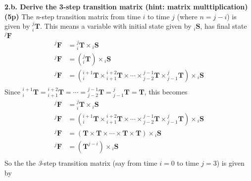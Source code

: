 \documentclass[a4paper,10pt]{article}
\newcommand{\matst}[1]{\ensuremath{{_{#1}}{\mathbf{S}}}}
\newcommand{\matfin}[1]{\ensuremath{{^{#1}}{\mathbf{F}}}}
\newcommand{\mattrans}[2]{{\ensuremath{{_{#1}^{#2}}{\mathbf{T}}}}}
\begin{document}
\newline\noindent\newline\noindent
\textbf{2.b. Derive the 3-step transition matrix (hint: matrix multtiplication) (5p)}
\newline\noindent\newline\noindent
The \emph{n}-step transition matrix from time $i$ to time $j$ (where $n=j-i$) is given by $\mattrans{i}{j}$. 
This means a variable with initial state given by $\matst{i}$, has final state $\matfin{j}$
\newline\noindent\newline\noindent
\begin{equation*}
\begin{split}
{\matfin{j}} &= \mattrans{i}{j}\times\matst{i}\\
{\matfin{j}} &= \left(\mattrans{i}{j}\right)\times\matst{i}\\
{\matfin{j}} &= \left(\mattrans{i}{i+1}\times\mattrans{i+1}{i+2}\times\cdots\times\mattrans{j-2}{j-1}\times\mattrans{j-1}{j} \right)\times\matst{i}\\
\end{split} 
\end{equation*}
\newline\noindent\newline\noindent
Since $\mattrans{i}{i+1} = \mattrans{i+1}{i+2} = \cdots = \mattrans{j-2}{j-1} = \mattrans{j-1}{j} = \mathbf{T}$, this becomes
\newline\noindent\newline\noindent
\begin{equation*}
\begin{split}
\matfin{j} &= \mattrans{i}{j}\times\matst{i}\\
\matfin{j} &= \left(\mattrans{i}{i+1}\times\mattrans{i+1}{i+2}\times\cdots\times\mattrans{j-2}{j-1}\times\mattrans{j-1}{j} \right)\times\matst{i}\\
\matfin{j} &= \left(\mathbf{T} \times \mathbf{T} \times \cdots \times \mathbf{T} \times \mathbf{T}\right)\times{\matst{i}}\\
\matfin{j} &= \left(\mathbf{T}^{j-i}\right)\times{\matst{i}}\\
\end{split} 
\end{equation*}
\newline\noindent\newline\noindent
So the the \emph{3}-step transition matrix (say from time $i=0$ to time $j=3$) is given by
\newline\noindent\newline\noindent
\end{document}
